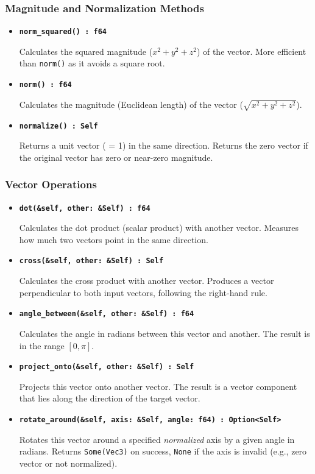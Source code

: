 \documentclass[12pt,a4paper]{article}
\begin{document}
\subsubsection{Magnitude and Normalization Methods}
\begin{itemize}
    \item \textbf{\texttt{norm\_squared() : f64}}
    
    Calculates the squared magnitude (\(x^2 + y^2 + z^2\)) of the vector. More efficient than \texttt{norm()} as it avoids a square root.

    \item \textbf{\texttt{norm() : f64}}

    Calculates the magnitude (Euclidean length) of the vector (\(\sqrt{x^2 + y^2 + z^2}\)).

    \item \textbf{\texttt{normalize() : Self}}
    
    Returns a unit vector ( = 1) in the same direction. Returns the zero vector if the original vector has zero or near-zero magnitude.
\end{itemize}

\subsubsection{Vector Operations}
\begin{itemize}
    \item \textbf{\texttt{dot(\&self, other: \&Self) : f64}}

    Calculates the dot product (scalar product) with another vector. Measures how much two vectors point in the same direction.

    \item \textbf{\texttt{cross(\&self, other: \&Self) : Self}}
    
    Calculates the cross product with another vector. Produces a vector perpendicular to both input vectors, following the right-hand rule.

    \item \textbf{\texttt{angle\_between(\&self, other: \&Self) : f64}}
    
    Calculates the angle in radians between this vector and another. The result is in the range \([0, \pi]\).

    \item \textbf{\texttt{project\_onto(\&self, other: \&Self) : Self}}
    
    Projects this vector onto another vector. The result is a vector component that lies along the direction of the target vector.

    \item \textbf{\texttt{rotate\_around(\&self, axis: \&Self, angle: f64) : Option<Self>}}
    
    Rotates this vector around a specified \emph{normalized} axis by a given angle in radians. Returns \texttt{Some(Vec3)} on success, \texttt{None} if the axis is invalid (e.g., zero vector or not normalized).
\end{itemize}
\end{document}
